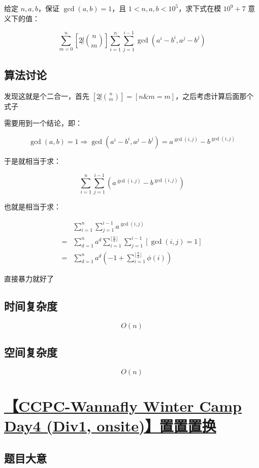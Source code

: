 \documentclass[UTF8]{article}
\begin{document}
给定 $n,a,b$，保证 $\gcd(a,b)=1$，且 $1 < n,a,b < 10^5$，求下式在模 $10^9+7$ 意义下的值：

$$
\sum_{m=0}^{n}[2 \not| {n \choose m}] \sum_{i=1}^{n}\sum_{j=1}^{i-1} \gcd(a^i-b^i,a^j-b^j)
$$

\subsection{算法讨论}

发现这就是个二合一，首先 $[2 \not| {n \choose m}]=[n \& m = m]$，之后考虑计算后面那个式子

需要用到一个结论，即：

$$
\gcd(a,b)=1 \Rightarrow \gcd(a^i-b^i,a^j-b^j)=a^{\gcd(i,j)}-b^{\gcd(i,j)}
$$

于是就相当于求：

$$
\sum_{i=1}^{n}\sum_{j=1}^{i-1}\left(a^{\gcd(i,j)}-b^{\gcd(i,j)}\right)
$$

也就是相当于求：

$$
\begin{aligned}
 &\sum_{i=1}^{n}\sum_{j=1}^{i-1}a^{\gcd(i,j)} \\
=&\sum_{d=1}^{n}a^d\sum_{i=1}^{\lfloor \frac{n}{d} \rfloor}\sum_{j=1}^{i-1}[\gcd(i,j)=1] \\
=&\sum_{d=1}^{n}a^d\left(-1+\sum_{i=1}^{\lfloor \frac{n}{d} \rfloor}\phi(i)\right)
\end{aligned}
$$

直接暴力就好了

\subsection{时间复杂度}

$$
O(n)
$$

\subsection{空间复杂度}

$$
O(n)
$$

\section{\href{https://www.zhixincode.com/contest/16/problem/G?problem_id=243}{【CCPC-Wannafly Winter Camp Day4 (Div1, onsite)】置置置换}}

\subsection{题目大意}
\end{document}
